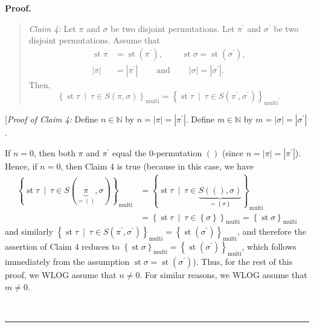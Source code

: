 \documentclass[numbers=enddot,12pt,final,onecolumn,notitlepage]{scrartcl}%
\theoremstyle{definition}
\newenvironment{statement}{\begin{quote}}{\end{quote}}
\newenvironment{proof}[1][Proof]{\noindent\textbf{#1.} }{\ \rule{0.5em}{0.5em}}
\newenvironment{verlong}{}{}
\begin{document}
\begin{verlong}
\begin{proof}
\begin{statement}
\textit{Claim 4:} Let $\pi$ and $\sigma$ be two disjoint permutations. Let
$\pi^{\prime}$ and $\sigma^{\prime}$ be two disjoint permutations. Assume that%
\begin{align*}
\operatorname{st} \pi    &  =\operatorname{st}\left(
\pi^{\prime}\right)  ,\ \ \ \ \ \ \ \ \ \ \operatorname{st} \sigma
=\operatorname{st}\left(  \sigma^{\prime}\right)  ,\\
\left\vert \pi\right\vert  &  =\left\vert \pi^{\prime}\right\vert
\ \ \ \ \ \ \ \ \ \ \text{and}\ \ \ \ \ \ \ \ \ \ \left\vert \sigma\right\vert
=\left\vert \sigma^{\prime}\right\vert .
\end{align*}
Then,
\[
\left\{  \operatorname{st} \tau   \ \mid\ \tau\in S\left(
\pi,\sigma\right)  \right\}  _{\operatorname*{multi}}=\left\{
\operatorname{st} \tau   \ \mid\ \tau\in S\left(  \pi^{\prime
},\sigma^{\prime}\right)  \right\}  _{\operatorname*{multi}}.
\]

\end{statement}

[\textit{Proof of Claim 4:}
Define $n\in\mathbb{N}$ by $n=\left\vert \pi\right\vert =\left\vert
\pi^{\prime}\right\vert $. Define $m\in\mathbb{N}$ by $m=\left\vert
\sigma\right\vert =\left\vert \sigma^{\prime}\right\vert $.

If $n=0$, then both $\pi$ and $\pi^{\prime}$ equal the $0$-permutation
$\left(  {}\right)  $ (since $n=\left\vert \pi\right\vert =\left\vert
\pi^{\prime}\right\vert $). Hence, if $n=0$, then Claim 4 is true (because in
this case, we have%
\begin{align*}
\left\{  \operatorname{st} \tau   \ \mid\ \tau\in S\left(
\underbrace{\pi}_{=\left(  {}\right)  },\sigma\right)  \right\}
_{\operatorname*{multi}}  &  =\left\{  \operatorname{st} \tau 
\ \mid\ \tau\in\underbrace{S\left(  \left(  {}\right)  ,\sigma\right)
}_{=\left\{  \sigma\right\}  }\right\}  _{\operatorname*{multi}}\\
&  =\left\{  \operatorname{st} \tau   \ \mid\ \tau\in\left\{
\sigma\right\}  \right\}  _{\operatorname*{multi}}
= \left\{  \operatorname{st} \sigma \right\}  _{\operatorname*{multi}}
\end{align*}
and similarly $\left\{  \operatorname{st} \tau   \ \mid\ \tau\in
S\left(  \pi^{\prime},\sigma^{\prime}\right)  \right\}
_{\operatorname*{multi}}=\left\{  \operatorname{st}\left(  \sigma^{\prime
}\right)  \right\}  _{\operatorname*{multi}}$, and therefore the assertion of
Claim 4 reduces to $\left\{  \operatorname{st} \sigma 
\right\}  _{\operatorname*{multi}}=\left\{  \operatorname{st}\left(
\sigma^{\prime}\right)  \right\}  _{\operatorname*{multi}}$, which follows
immediately from the assumption $\operatorname{st} \sigma 
=\operatorname{st}\left(  \sigma^{\prime}\right)  $). Thus, for the rest of
this proof, we WLOG assume that $n\neq0$. For similar reasons, we WLOG assume
that $m\neq0$.


\end{proof}
\end{verlong}
\end{document}
